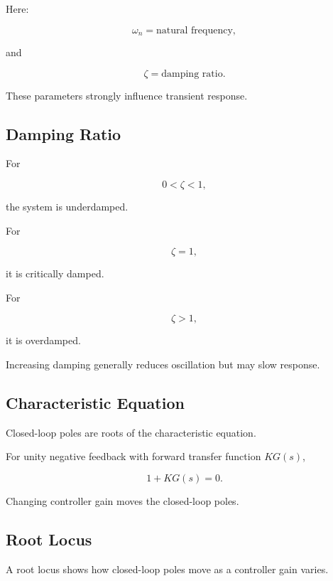 Here:

\[
\omega_n
=
\text{natural frequency},
\]

and

\[
\zeta
=
\text{damping ratio}.
\]

These parameters strongly influence transient response.

\subsection{Damping Ratio}
\label{subsec:control-damping-ratio}

For

\[
0<\zeta<1,
\]

the system is underdamped.

For

\[
\zeta=1,
\]

it is critically damped.

For

\[
\zeta>1,
\]

it is overdamped.

Increasing damping generally reduces oscillation but may slow response.

\subsection{Characteristic Equation}
\label{subsec:control-characteristic-equation}

Closed-loop poles are roots of the characteristic equation.

For unity negative feedback with forward transfer function \(K G(s)\),

\[
\boxed{
1+KG(s)=0.
}
\]

Changing controller gain moves the closed-loop poles.

\subsection{Root Locus}
\label{subsec:root-locus}

A root locus shows how closed-loop poles move as a controller gain varies.

